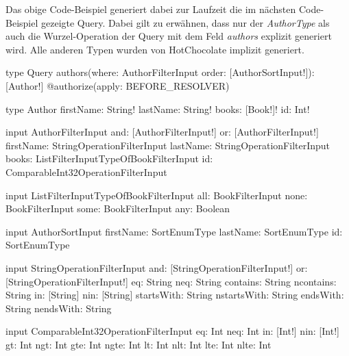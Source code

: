 

Das obige Code-Beispiel generiert dabei zur Laufzeit die im nächsten Code-Beispiel gezeigte Query.
Dabei gilt zu erwähnen, dass nur der \textit{AuthorType} als auch die Wurzel-Operation der Query mit dem Feld \textit{authors} explizit generiert wird.
Alle anderen Typen wurden von HotChocolate implizit generiert.

\begin{JsCode}
type Query{
    authors(where: AuthorFilterInput order: [AuthorSortInput!]): [Author!] @authorize(apply: BEFORE_RESOLVER)
}

type Author {
    firstName: String!
    lastName: String!
    books: [Book!]!
    id: Int!
}

input AuthorFilterInput {
    and: [AuthorFilterInput!]
    or: [AuthorFilterInput!]
    firstName: StringOperationFilterInput
    lastName: StringOperationFilterInput
    books: ListFilterInputTypeOfBookFilterInput
    id: ComparableInt32OperationFilterInput
}

input ListFilterInputTypeOfBookFilterInput {
  all: BookFilterInput
  none: BookFilterInput
  some: BookFilterInput
  any: Boolean
}

input AuthorSortInput {
    firstName: SortEnumType
    lastName: SortEnumType
    id: SortEnumType
}

input StringOperationFilterInput {
  and: [StringOperationFilterInput!]
  or: [StringOperationFilterInput!]
  eq: String
  neq: String
  contains: String
  ncontains: String
  in: [String]
  nin: [String]
  startsWith: String
  nstartsWith: String
  endsWith: String
  nendsWith: String
}

input ComparableInt32OperationFilterInput {
    eq: Int
    neq: Int
    in: [Int!]
    nin: [Int!]
    gt: Int
    ngt: Int
    gte: Int
    ngte: Int
    lt: Int
    nlt: Int
    lte: Int
    nlte: Int
}
\end{JsCode}


